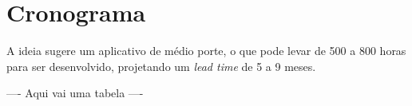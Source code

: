 \chapter[Cronograma - PENDENTE]{Cronograma}


A ideia sugere um aplicativo de médio porte, o que pode levar de 500 a 800 horas para ser desenvolvido, projetando um \textit{lead time} de 5 a 9 meses.

---- Aqui vai uma tabela ----
%
%
%
%
